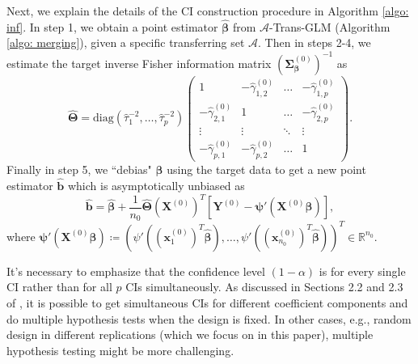 \documentclass[12pt]{article}
\DeclareMathOperator*{\argmin}{arg\,min}
\newcommand{\te}{\mathbb{E}}
\newcommand{\bbeta}{\bm{\beta}}
\newcommand{\hbeta}{\hat{\bm{\beta}}}
\newcommand{\htau}{\hat{\tau}}
\newcommand{\bgamma}{\bm{\gamma}}
\newcommand{\bgammak}[1]{\bm{\gamma}^{(#1)}}
\newcommand{\hgammak}[1]{\hat{\gamma}^{(#1)}}
\newcommand{\bxk}[1]{\bm{x}^{(#1)}}
\newcommand{\bXk}[1]{\bm{X}^{(#1)}}
\newcommand{\bwk}[1]{\bm{w}^{(#1)}}
\newcommand{\ma}{\mathcal{A}}
\newcommand{\bpsi}{\bm{\psi}}
\newcommand{\<}{\langle}
\renewcommand{\>}{\rangle}
\newcommand{\hTheta}{\widehat{\bm{\Theta}}}
\newcommand{\bSigmak}[1]{\bm{\Sigma}^{(#1)}}
\begin{document}
Next, we explain the details of the CI construction procedure in Algorithm \ref{algo: inf}. In step 1, we obtain a point estimator $\hbeta$ from $\ma$-Trans-GLM (Algorithm \ref{algo: merging}), given a specific transferring set $\ma$. Then in steps 2-4, we estimate the target inverse Fisher information matrix $(\bSigmak{0}_{\bbeta})^{-1}$ as 
\begin{equation}\label{eq: theta formula}
	\hTheta = \text{diag}(\htau_1^{-2}, \ldots, \htau_p^{-2})
	\begin{pmatrix}
		1 &-\hgammak{0}_{1,2} &\hdots  &-\hgammak{0}_{1,p} \\
		-\hgammak{0}_{2,1} &1 &\hdots  &-\hgammak{0}_{2,p} \\
		\vdots &\vdots &\ddots &\vdots \\
		-\hgammak{0}_{p,1} &-\hgammak{0}_{p,2} &\hdots &1
	\end{pmatrix}.
\end{equation}
Finally in step 5, we ``debias" $\hbeta$ using the target data to get a new point estimator $\hat{\bm{b}}$ which is asymptotically unbiased as
\begin{equation}\label{eq: b hat}
	\hat{\bm{b}} = \hbeta +\frac{1}{n_0}\hTheta(\bXk{0})^T[\bm{Y}^{(0)} - \bpsi'(\bXk{0}\hbeta)],
\end{equation}
where $\bpsi'(\bXk{0}\hbeta) \coloneqq (\psi'((\bxk{0}_1)^T\hbeta), \ldots, \psi'((\bxk{0}_{n_0})^T\hbeta))^T \in \mathbb{R}^{n_0}$. 

It's necessary to emphasize that the confidence level $(1-\alpha)$ is for every single CI rather than for all $p$ CIs simultaneously. As discussed in Sections 2.2 and 2.3 of \cite{van2014asymptotically}, it is possible to get simultaneous CIs for different coefficient components and do multiple hypothesis tests when the design is fixed. In other cases, e.g., random design in different replications (which we focus on in this paper), multiple hypothesis testing might be more challenging.



%
 
\end{document}
